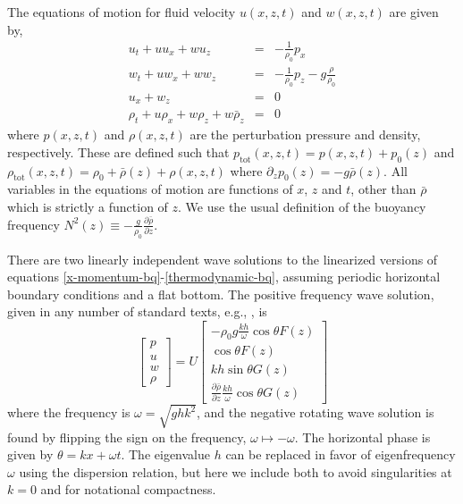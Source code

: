 \documentclass{jfm}
\begin{document}
The equations of motion for fluid velocity $u(x,z,t)$ and $w(x,z,t)$ are given by,
\begin{eqnarray}
\label{x-momentum-bq}
u_t +u u_x + w u_z&=& - \frac{1}{\rho_0} p_x \\ \label {z-momentum-bq}
w_t +u w_x + w w_z &=& - \frac{1}{\rho_0} p_z - g \frac{\rho}{\rho_0} \\ \label{continuity-bq}
u_x + w_z &=& 0 \\ \label{thermodynamic-bq}
\rho_t + u \rho_x + w \rho_z + w \bar{\rho}_z &=& 0
\end{eqnarray}
where $p(x,z,t)$ and $\rho(x,z,t)$ are the perturbation pressure and density, respectively. These are defined such that $p_{\textrm{tot}}(x,z,t) = p(x,z,t) + p_0(z)$ and $\rho_{\textrm{tot}}(x,z,t) = \rho_0 + \bar{\rho}(z) + \rho(x,z,t) $ where $\partial_z p_0(z) = -g \bar{\rho}(z)$. All variables in the equations of motion are functions of $x$, $z$ and $t$, other than $\bar{\rho}$ which is strictly a function of $z$. We use the usual definition of the buoyancy frequency $N^2(z) \equiv -\frac{g}{\rho_0} \frac{\partial \bar{\rho}}{\partial z}$.

There are two linearly independent wave solutions to the linearized versions of equations \ref{x-momentum-bq}-\ref{thermodynamic-bq}, assuming periodic horizontal boundary conditions and a flat bottom. The positive frequency wave solution, given in any number of standard texts, e.g., \citet{cushman2011-book}, is
\begin{equation}
\label{positive_wave_solution}
\left[\begin{array}{c} p \\ u  \\ w  \\ \rho  \end{array}\right] =
U \left[\begin{array}{c}
- \rho_0 g \frac{k h}{\omega} \cos \theta F(z)\\
	 \cos \theta F(z) \\
    k h \sin \theta  G(z) \\
	\frac{\partial \bar{\rho}}{\partial z} \frac{k h}{\omega} \cos \theta G(z)
 \end{array}\right]
\end{equation}
where the frequency is $\omega = \sqrt{g h k^2}$, and the negative rotating wave solution is found by flipping the sign on the frequency, $\omega \mapsto -\omega$. The horizontal phase is given by $\theta=k x + \omega t$. The eigenvalue $h$ can be replaced in favor of eigenfrequency $\omega$ using the dispersion relation, but here we include both to avoid singularities at $k=0$ and for notational compactness. 
\end{document}

